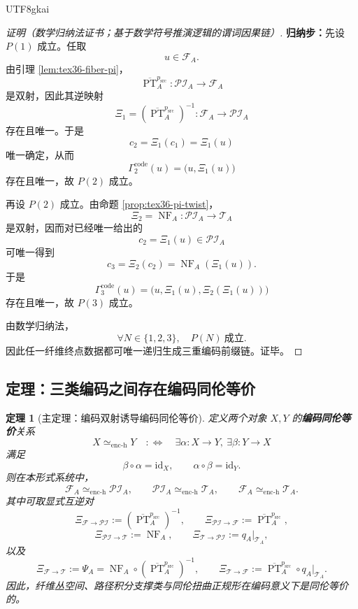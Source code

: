 \documentclass[12pt]{article}
\newtheorem{theorem}{定理}[section]
\newcommand{\PT}{\operatorname{PT}}
\newcommand{\NF}{\operatorname{NF}}
\newcommand{\id}{\mathrm{id}}
\begin{document}
\begin{CJK*}{UTF8}{gkai}
\begin{proof}[证明（数学归纳法证书；基于数学符号推演逻辑的谓词因果链）]
\textbf{归纳步：}先设 $P(1)$ 成立。任取
\[
  u\in \mathcal F_A.
\]
由引理 \ref{lem:tex36-fiber-pi}，
\[
  \overline{\PT}_A^{p_{\mathrm{src}}}:
  \mathcal{PI}_A\to \mathcal F_A
\]
是双射，因此其逆映射
\[
  \Xi_1=(\overline{\PT}_A^{p_{\mathrm{src}}})^{-1}
  :
  \mathcal F_A\to \mathcal{PI}_A
\]
存在且唯一。于是
\[
  c_2=\Xi_1(c_1)=\Xi_1(u)
\]
唯一确定，从而
\[
  \Gamma_2^{\mathrm{code}}(u)
  =
  \bigl(u,\Xi_1(u)\bigr)
\]
存在且唯一，故 $P(2)$ 成立。

再设 $P(2)$ 成立。由命题 \ref{prop:tex36-pi-twist}，
\[
  \Xi_2=\NF_A:\mathcal{PI}_A\to \mathcal T_A
\]
是双射，因而对已经唯一给出的
\[
  c_2=\Xi_1(u)\in \mathcal{PI}_A
\]
可唯一得到
\[
  c_3=\Xi_2(c_2)=\NF_A(\Xi_1(u)).
\]
于是
\[
  \Gamma_3^{\mathrm{code}}(u)
  =
  \bigl(
    u,\Xi_1(u),\Xi_2(\Xi_1(u))
  \bigr)
\]
存在且唯一，故 $P(3)$ 成立。

由数学归纳法，
\[
  \forall N\in\{1,2,3\},\quad P(N)\ \text{成立}.
\]
因此任一纤维终点数据都可唯一递归生成三重编码前缀链。证毕。
\end{proof}

\subsection{定理：三类编码之间存在编码同伦等价}
\label{subsec:tex36-encoding-homotopy}

\begin{theorem}[主定理：编码双射诱导编码同伦等价]
\label{thm:tex36-encoding-homotopy}
定义两个对象 $X,Y$ 的\textbf{编码同伦等价}关系
\[
  X\simeq_{\mathrm{enc\text{-}h}}Y
  \quad:\Longleftrightarrow\quad
  \exists \alpha:X\to Y,\ \exists \beta:Y\to X
\]
满足
\[
  \beta\circ \alpha=\id_X,
  \qquad
  \alpha\circ \beta=\id_Y.
\]
则在本形式系统中，
\[
  \mathcal F_A\simeq_{\mathrm{enc\text{-}h}}\mathcal{PI}_A,
  \qquad
  \mathcal{PI}_A\simeq_{\mathrm{enc\text{-}h}}\mathcal T_A,
  \qquad
  \mathcal F_A\simeq_{\mathrm{enc\text{-}h}}\mathcal T_A.
\]
其中可取显式互逆对
\[
  \Xi_{\mathcal F\to \mathcal{PI}}
  :=
  (\overline{\PT}_A^{p_{\mathrm{src}}})^{-1},
  \qquad
  \Xi_{\mathcal{PI}\to \mathcal F}
  :=
  \overline{\PT}_A^{p_{\mathrm{src}}},
\]
\[
  \Xi_{\mathcal{PI}\to \mathcal T}
  :=
  \NF_A,
  \qquad
  \Xi_{\mathcal T\to \mathcal{PI}}
  :=
  q_A|_{\mathcal T_A},
\]
以及
\[
  \Xi_{\mathcal F\to \mathcal T}
  :=
  \Psi_A
  =
  \NF_A\circ (\overline{\PT}_A^{p_{\mathrm{src}}})^{-1},
  \qquad
  \Xi_{\mathcal T\to \mathcal F}
  :=
  \overline{\PT}_A^{p_{\mathrm{src}}}\circ q_A|_{\mathcal T_A}.
\]
因此，纤维丛空间、路径积分支撑类与同伦扭曲正规形在编码意义下是同伦等价的。
\end{theorem}


\end{CJK*}
\end{document}
